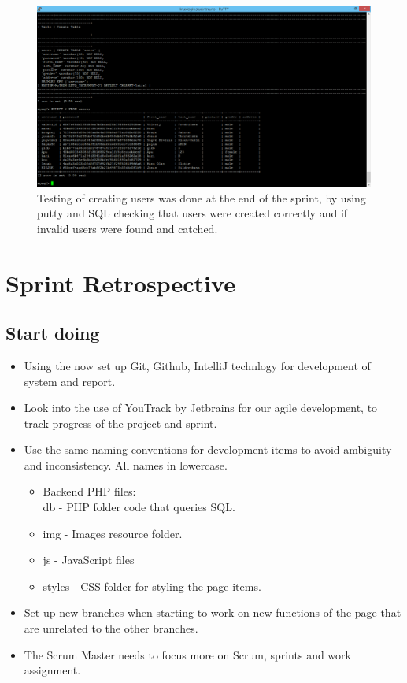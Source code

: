 \begin{figure}[ht!]
\centering
\includegraphics[width={\linewidth}]{Sprint2/img/Sprint2-testing.png}
\caption{ Testing of creating users was done at the end of the sprint, by using putty and SQL checking that users were created correctly and if invalid users were found and catched. \label{overflow}}
\end{figure}

\section{Sprint Retrospective} 
\label{sec:S2Retrospective}


\subsection{Start doing}
\label{subsec:S2RetrospectiveStart}
\begin{itemize}
\item Using the now set up Git, Github, IntelliJ technlogy for development of system and report. 
\item Look into the use of YouTrack by Jetbrains for our agile development, to track progress of the project and sprint. 
\item Use the same naming conventions for development items to avoid ambiguity and inconsistency. All names in lowercase. 
\begin{itemize}
\item Backend PHP files: \\ db - PHP folder code that queries SQL. 
\item img - Images resource folder. 
\item js - JavaScript files
\item styles - CSS folder for styling the page items. 
\end{itemize}
\item Set up new branches when starting to work on new functions of the page that are unrelated to the other branches. 
\item The Scrum Master needs to focus more on Scrum, sprints and work assignment.
\end{itemize}

